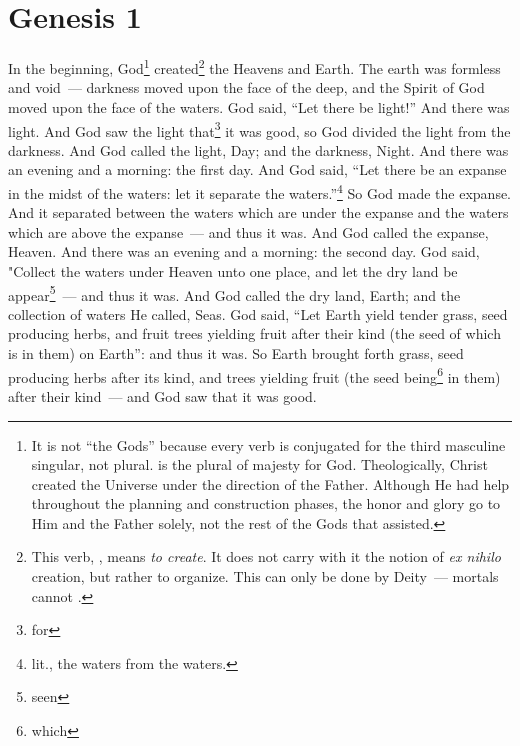\section{Genesis 1}\label{Genesis 1}
\begin{enumerate}
     In the beginning, God\footnote{It is not ``the Gods'' because every verb is conjugated for the third masculine singular, not plural.  is the plural of majesty for God. Theologically, Christ created the Universe under the direction of the Father. Although He had help throughout the planning and construction phases, the honor and glory go to Him and the Father solely, not the rest of the Gods that assisted.} created\footnote{This verb, , means \emph{to create}. It does not carry with it the notion of \emph{ex nihilo} creation, but rather to organize. This can only be done by Deity~--- mortals cannot .} the Heavens and Earth.%
     The earth was formless and void~--- darkness moved upon the face of the deep, and the Spirit of God moved upon the face of the waters.%
     God said, ``Let there be light!'' And there was light.%
     And God saw the light that\footnote{for} it was good, so God divided the light from the darkness.%
     And God called the light, Day; and the darkness, Night. And there was an evening and a morning: the first day.%
     And God said, ``Let there be an expanse in the midst of the waters: let it separate the waters.''\footnote{lit., the waters from the waters.}%
     So God made the expanse. And it separated between the waters which are under the expanse and the waters which are above the expanse~--- and thus it was.%
     And God called the expanse, Heaven. And there was an evening and a morning: the second day.%
     God said, "Collect the waters under Heaven unto one place, and let the dry land be appear\footnote{seen}~--- and thus it was.%
     And God called the dry land, Earth; and the collection of waters He called, Seas.%
     God said, ``Let Earth yield tender grass, seed producing herbs, and fruit trees yielding fruit after their kind (the seed of which is in them) on Earth'': and thus it was.%
     So Earth brought forth grass, seed producing herbs after its kind, and trees yielding fruit (the seed being\footnote{which} in them) after their kind~--- and God saw that it was good.%

\end{enumerate}
